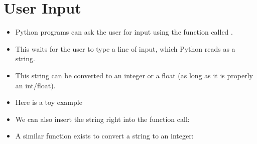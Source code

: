 \documentclass[letterpaper,10pt,english]{sphinxmanual}
\begin{document}
\section{User Input}
\label{\detokenize{lecture_notes/lec03_strings:user-input}}\begin{itemize}
\item {} 
Python programs can ask the user for input using the function called
.

\item {} 
This waits for the user to type a line of input, which Python reads
as a string.

\item {} 
This string can be converted to an integer or a float (as long as it
is properly an int/float).

\item {} 
Here is a toy example

%
\begin{sphinxVerbatim}[commandchars=\\\{\}]
  
   
\end{sphinxVerbatim}

\item {} 
We can also insert the string right into the  function
call:

%
\begin{sphinxVerbatim}[commandchars=\\\{\}]
  
  
   
\end{sphinxVerbatim}

\item {} 
A similar function exists to convert a string to an integer:


\end{itemize}
\end{document}

